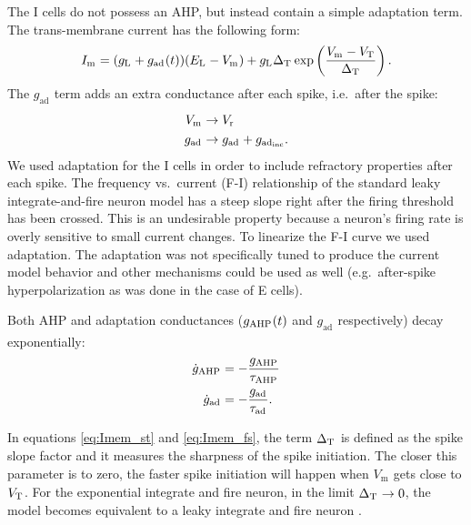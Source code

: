 \documentclass[a4paper,12pt]{article}
\newcommand{\ssc}[3]{\ensuremath{#1_{\text{#2}_{\text{#3}}}}}
\newcommand{\Vm}       {\ssc{V}      {m}     {}}
\newcommand{\Imem}     {\ssc{I}      {m}     {}}
\newcommand{\gL}       {\ssc{g}      {\scriptsize{L}}  {}}
\newcommand{\EL}       {\ssc{E}      {\scriptsize{L}}  {}}
\newcommand{\gAHP}     {\ssc{g}      {\scriptsize{AHP}}{}}
\newcommand{\tauAHP}   {\ssc{\tau}   {\scriptsize{AHP}}{}}
\newcommand{\VT}       {\ssc{V}      {\scriptsize{T}}  {}}
\newcommand{\Vr}       {\ssc{V}      {r}     {}}
\newcommand{\gad}      {\ssc{g}      {ad}{}}
\newcommand{\tauad}    {\ssc{\tau}   {ad}{}}
\newcommand{\gadinc}   {\ssc{g}      {ad}{inc}}
\newcommand{\deltaT}   {\ssc{\Delta} {\scriptsize{T}}{}}
\newcommand{\dgAHP}  {\ssc{\dot{g}}{\scriptsize{AHP}} {}}
\newcommand{\dgad}   {\ssc{\dot{g}}{\scriptsize{ad}}  {}}
\begin{document}
The I cells do not possess an AHP, but instead contain a simple adaptation
term. The trans-membrane current has the following form:
\begin{equation}
    \Imem = (\gL + \gad(t))(\EL-\Vm) + \gL \deltaT \exp\left(\frac{\Vm - \VT}{\deltaT}\right).
    \label{eq:Imem_fs}
\end{equation}
The $\gad$ term adds an extra conductance after each spike, i.e.\ after the
spike:
\begin{align}
    \Vm   & \rightarrow \Vr       \notag \\
    \gad  & \rightarrow \gad + \gadinc.
    \label{eq:afterspike_fs}
\end{align}
We used adaptation for the I cells in order to include refractory properties
after each spike. The frequency vs.\ current (F-I) relationship of the standard
leaky integrate-and-fire neuron model has a steep slope right after the firing
threshold has been crossed. This is an undesirable property because a neuron's
firing rate is overly sensitive to small current changes. To linearize the F-I
curve we used adaptation. The adaptation was not specifically tuned to produce
the current model behavior and other mechanisms could be used as well (e.g.\
after-spike hyperpolarization as was done in the case of E cells).


Both AHP and adaptation conductances ($\gAHP(t)$ and $\gad$ respectively) decay
exponentially:
\begin{align}
    \dgAHP   &=  -\frac{\gAHP}{\tauAHP} \notag \\
    \dgad    &=  -\frac{\gad }{\tauad}.
    \label{eq:dgAHPad}
\end{align}

In equations \eqref{eq:Imem_st} and \eqref{eq:Imem_fs}, the term $\deltaT$ is
defined as the spike slope factor \citep{FourcaudTrocme:2003wz} and it measures
the sharpness of the spike initiation. The closer this parameter is to
zero, the faster spike initiation will happen when $\Vm$ gets close to $\VT$.
For the exponential integrate and fire neuron, in the limit $\deltaT
\rightarrow 0$, the model becomes equivalent to a leaky integrate and fire
neuron \citep{FourcaudTrocme:2003wz}.
\end{document}
